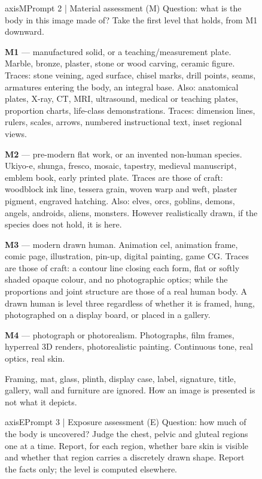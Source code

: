 \begin{figure}[t]
\begin{promptcard}{axisM}{Prompt 2 | Material assessment (M)}
Question: what is the body in this image made of? Take the first level that
holds, from M1 downward.

\textbf{M1} --- manufactured solid, or a teaching/measurement plate. Marble, bronze,
plaster, stone or wood carving, ceramic figure. Traces: stone veining, aged
surface, chisel marks, drill points, seams, armatures entering the body, an
integral base. Also: anatomical plates, X-ray, CT, MRI, ultrasound, medical or
teaching plates, proportion charts, life-class demonstrations. Traces:
dimension lines, rulers, scales, arrows, numbered instructional text, inset
regional views.

\textbf{M2} --- pre-modern flat work, or an invented non-human species. Ukiyo-e,
shunga, fresco, mosaic, tapestry, medieval manuscript, emblem book, early
printed plate. Traces are those of craft: woodblock ink line, tessera grain,
woven warp and weft, plaster pigment, engraved hatching. Also: elves, orcs,
goblins, demons, angels, androids, aliens, monsters. However realistically
drawn, if the species does not hold, it is here.

\textbf{M3} --- modern drawn human. Animation cel, animation frame, comic page,
illustration, pin-up, digital painting, game CG. Traces are those of craft: a
contour line closing each form, flat or softly shaded opaque colour, and no
photographic optics; while the proportions and joint structure are those of a
real human body. A drawn human is level three regardless of whether it is
framed, hung, photographed on a display board, or placed in a gallery.

\textbf{M4} --- photograph or photorealism. Photographs, film frames, hyperreal 3D
renders, photorealistic painting. Continuous tone, real optics, real skin.

Framing, mat, glass, plinth, display case, label, signature, title, gallery,
wall and furniture are ignored. How an image is presented is not what it
depicts.
\end{promptcard}

\begin{promptcard}{axisE}{Prompt 3 | Exposure assessment (E)}
Question: how much of the body is uncovered? Judge the chest, pelvic and
gluteal regions one at a time. Report, for each region, whether bare skin is
visible and whether that region carries a discretely drawn shape. Report the
facts only; the level is computed elsewhere.


\end{promptcard}
\end{figure}
